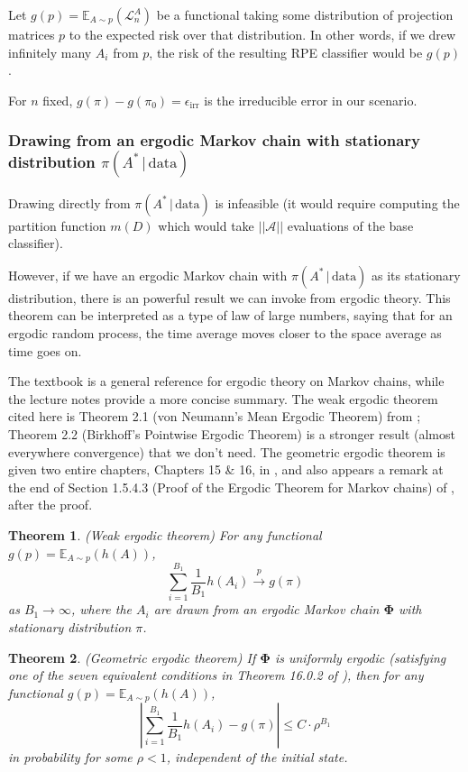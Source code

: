 \documentclass[ejs,preprint]{imsart}
\newtheorem{theorem}{Theorem}
\newcommand\E{\mathbb{E}}
\newcommand\risk{\mathcal{L}}
\begin{document}
Let $g(p)=\E_{A\sim p}(\risk_n^A)$ be a functional taking some distribution of projection matrices $p$ to the expected risk over that distribution. In other words, if we drew infinitely many $A_i$ from $p$, the risk of the resulting RPE classifier would be $g(p)$.

For $n$ fixed, $g(\pi)-g(\pi_0)=\epsilon_\mathrm{irr}$ is the irreducible error in our scenario.

\subsubsection{Drawing from an ergodic Markov chain with stationary distribution $\pi(A^*\,|\,\mathrm{data})$}

Drawing directly from $\pi(A^*\,|\,\mathrm{data})$ is infeasible (it would require computing the partition function $m(D)$ which would take $||\mathcal A||$ evaluations of the base classifier).

However, if we have an ergodic Markov chain with $\pi(A^*\,|\,\mathrm{data})$ as its stationary distribution, there is an powerful result we can invoke from ergodic theory. This theorem can be interpreted as a type of law of large numbers, saying that for an ergodic random process, the time average moves closer to the space average as time goes on.

The textbook \cite{MT93} is a general reference for ergodic theory on Markov chains, while the lecture notes \cite{Sarig08} provide a more concise summary. The weak ergodic theorem cited here is Theorem 2.1 (von Neumann's Mean Ergodic Theorem) from \cite{Sarig08}; Theorem 2.2 (Birkhoff's Pointwise Ergodic Theorem) is a stronger result (almost everywhere convergence) that we don't need. The geometric ergodic theorem is given two entire chapters, Chapters 15 \& 16, in \cite{MT93}, and also appears a remark at the end of Section 1.5.4.3 (Proof of the Ergodic Theorem for Markov chains) of \cite{Sarig08}, after the proof.

\begin{theorem}
(Weak ergodic theorem) For any functional $g(p)=\E_{A\sim p}(h(A))$, 
\[
\sum_{i=1}^{B_1}\frac{1}{B_1} h(A_i) \overset{p}{\to} g(\pi)
\]
as $B_1\to\infty$, where the $A_i$ are drawn from an ergodic Markov chain $\bm{\Phi}$ with stationary distribution $\pi$.
\end{theorem}

\begin{theorem}
(Geometric ergodic theorem) If $\bm\Phi$ is uniformly ergodic (satisfying one of the seven equivalent conditions in Theorem 16.0.2 of \cite{MT93}), then for any functional $g(p)=\E_{A\sim p}(h(A))$, 
\[
\left|\sum_{i=1}^{B_1}\frac{1}{B_1} h(A_i)-g(\pi)\right|\leq C\cdot \rho^{B_1}
\]
in probability for some $\rho<1$, independent of the initial state.
\end{theorem}
\end{document}
